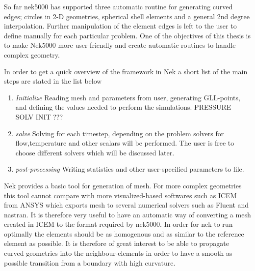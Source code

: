 So far nek5000 has supported three automatic routine for generating curved edges;
circles in 2-D geometries, spherical shell elements and a general 2nd degree interpolation.
Further manipulation of the element edges is left to the user to define manually
for each particular problem. One of the objectives of this thesis is to make Nek5000 more
user-friendly and create automatic routines to handle complex geometry.

In order to get a quick overview of the framework in Nek a short list of the main steps
are stated in the list below 
%
\begin{enumerate}
    \item \emph{Initialize} 
    \subitem Reading mesh and parameters from user, generating GLL-points, and defining
        the values needed to perform the simulations. PRESSURE SOLV INIT ??? 
    \item \emph{solve}
     \subitem Solving for each timestep, depending on the problem solvers for flow,temperature 
     and other scalars will be performed. The user is free to choose different solvers which 
     will be discussed later.
 \item \emph{post-processing}
     \subitem Writing statistics and other user-specified parameters to file.
\end{enumerate}
%
Nek provides a basic tool for generation of mesh. For more complex geometries this tool cannot compare with more visualized-based softwares 
such as ICEM from ANSYS which exports mesh to several numerical solvers such as Fluent and nastran.
It is therefore very useful to have an automatic way of converting a mesh created in ICEM to the format required by nek5000. 
In order for nek to run optimally the elements should be as homogenous and as similar to the reference element as possible. 
It is therefore of great interest to be able to propagate curved geometries into the neighbour-elements in order to have a smooth as 
possible transition from a boundary with high curvature.

